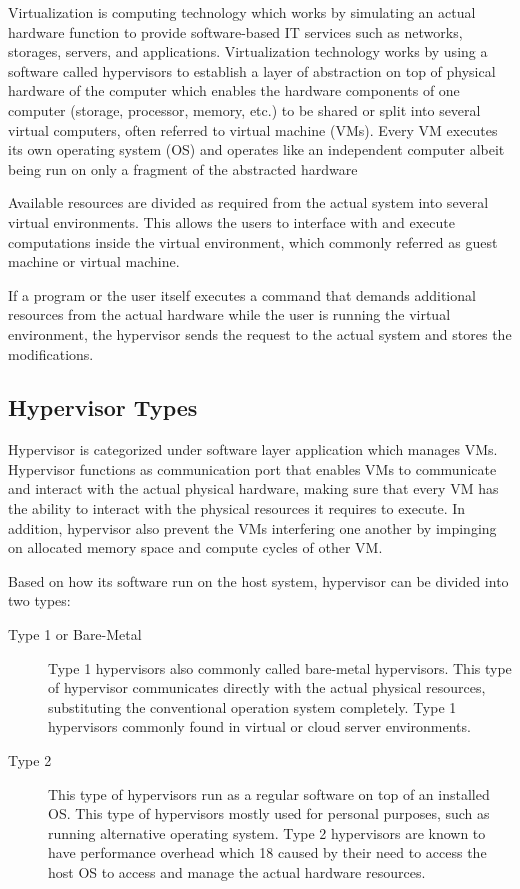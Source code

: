 \documentclass[../index.tex]{subfiles}
\begin{document}
Virtualization is computing technology which works by simulating an actual hardware function to
provide software-based IT services such as networks, storages, servers, and applications.
Virtualization technology works by using a software called hypervisors to establish a layer of
abstraction on top of physical hardware of the computer which enables the hardware components of one
computer (storage, processor, memory, etc.) to be shared or split into several virtual computers,
often referred to virtual machine (VMs). Every VM executes its own operating system (OS) and
operates like an independent computer albeit being run on only a fragment of the abstracted hardware

Available resources are divided as required from the actual system into several virtual
environments. This allows the users to interface with and execute computations inside the virtual
environment, which commonly referred as guest machine or virtual machine.

If a program or the user itself executes a command that demands additional resources from the actual
hardware while the user is running the virtual environment, the hypervisor sends the request to the
actual system and stores the modifications.

\subsection{Hypervisor Types}

Hypervisor is categorized under software layer application which manages VMs. Hypervisor functions
as communication port that enables VMs to communicate and interact with the actual physical
hardware, making sure that every VM has the ability to interact with the physical resources it
requires to execute. In addition, hypervisor also prevent the VMs interfering one another by
impinging on allocated memory space and compute cycles of other VM.

Based on how its software run on the host system, hypervisor can be divided into two types:

\begin{description}

	\item[Type 1 or Bare-Metal] Type 1 hypervisors also commonly called bare-metal hypervisors. This
		type of hypervisor communicates directly with the actual physical resources, substituting the
		conventional operation system completely. Type 1 hypervisors commonly found in virtual or cloud
		server environments.

	\item[Type 2] This type of hypervisors run as a regular software on top of an installed OS. This
		type of hypervisors mostly used for personal purposes, such as running alternative operating
		system. Type 2 hypervisors are known to have performance overhead which 18 caused by their need
		to access the host OS to access and manage the actual hardware resources.

\end{description}
\end{document}
